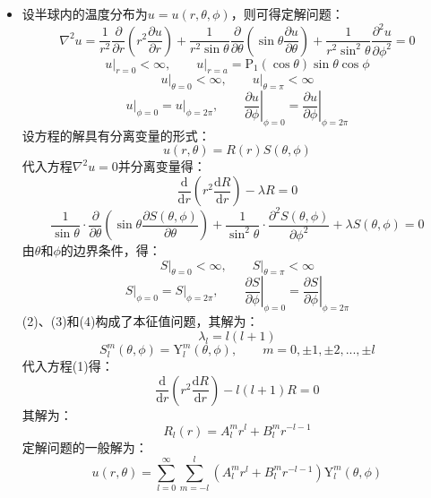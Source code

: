 \documentclass[fontset=windows]{ctexart}
\begin{document}
\begin{itemize}
    综上，定解问题的解为：
    \begin{align*}
    u(r,\theta)
    &= \frac{r}{a}\sqrt{\frac{2\pi}{3}}\left[\mathrm{Y}_1^1(\theta,\phi) + \mathrm{Y}_1^{-1}(\theta,\phi)\right] \\
    &= \frac{r}{a}\mathrm{P}_1^1(\cos\theta)\cos\phi \\
    &= -\frac{r}{a}\sin\theta\cos\phi
    \end{align*}
    \bigskip

    \item[11.(2)]
    设半球内的温度分布为$u = u(r,\theta,\phi)$，则可得定解问题：
    \[
    \nabla^2 u = \frac{1}{r^2}\frac{\partial}{\partial r}\left(r^2\frac{\partial u}{\partial r}\right) + \frac{1}{r^2\sin\theta}\frac{\partial}{\partial\theta}\left(\sin\theta\frac{\partial u}{\partial\theta}\right) + \frac{1}{r^2\sin^2\theta}\frac{\partial^2 u}{\partial\phi^2} = 0
    \]
    \[
    \left.u\right|_{r=0} < \infty,\qquad \left.u\right|_{r=a} = \mathrm{P}_1(\cos\theta)\sin\theta\cos\phi
    \]
    \[
    \left.u\right|_{\theta=0} < \infty,\qquad \left.u\right|_{\theta=\pi} < \infty
    \]
    \[
    \left.u\right|_{\phi=0} = \left.u\right|_{\phi=2\pi},\qquad \left.\frac{\partial u}{\partial\phi}\right|_{\phi=0} = \left.\frac{\partial u}{\partial\phi}\right|_{\phi=2\pi}
    \]
    设方程的解具有分离变量的形式：
    \[
    u(r,\theta) = R(r)S(\theta,\phi)
    \]
    代入方程$\nabla^2 u=0$并分离变量得：
    \[
    \frac{\mathrm{d}}{\mathrm{d}r}\left(r^2\frac{\mathrm{d}R}{\mathrm{d}r}\right) - \lambda R = 0 \tag{1}
    \]
    \[
    \frac{1}{\sin\theta}\cdot\frac{\partial}{\partial\theta}\left(\sin\theta\frac{\partial S(\theta,\phi)}{\partial\theta}\right) + \frac{1}{\sin^2\theta}\cdot\frac{\partial^2 S(\theta,\phi)}{\partial\phi^2} + \lambda S(\theta,\phi) = 0 \tag{2}
    \]
    由$\theta$和$\phi$的边界条件，得：
    \[
    \left.S\right|_{\theta=0} < \infty,\qquad \left.S\right|_{\theta=\pi} < \infty \tag{3}
    \]
    \[
    \left.S\right|_{\phi=0} = \left.S\right|_{\phi=2\pi},\qquad \left.\frac{\partial S}{\partial\phi}\right|_{\phi=0} = \left.\frac{\partial S}{\partial\phi}\right|_{\phi=2\pi} \tag{4}
    \]
    (2)、(3)和(4)构成了本征值问题，其解为：
    \[
    \lambda_l = l(l+1)
    \]
    \[
    S_l^m(\theta,\phi) = \mathrm{Y}_l^m(\theta,\phi),\qquad m = 0,\pm1,\pm2,...,\pm l
    \]
    代入方程(1)得：
    \[
    \frac{\mathrm{d}}{\mathrm{d}r}\left(r^2\frac{\mathrm{d}R}{\mathrm{d}r}\right) - l(l+1)R = 0 \tag{5}
    \]
    其解为：
    \[
    R_l(r) = A_l^m r^l + B_l^m r^{-l-1}
    \]
    定解问题的一般解为：
    \[
    u(r,\theta) = \sum_{l=0}^{\infty}\sum_{m=-l}^{l}\left(A_l^m r^l + B_l^m r^{-l-1}\right)\mathrm{Y}_l^m(\theta,\phi)
\]
\end{itemize}
\end{document}
